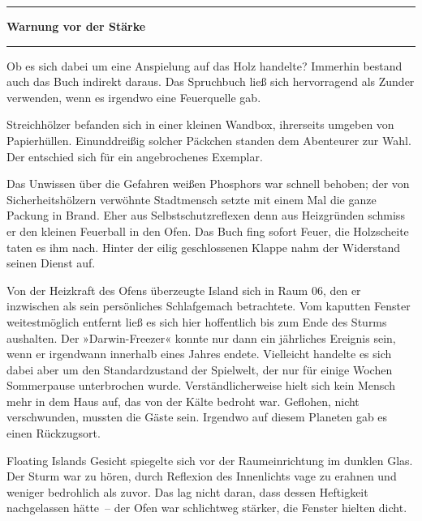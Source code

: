 \noindent \parbox{\textwidth}{ \vspace{3ex} \hrule \vspace{3ex}

\textbf{Warnung vor der Stärke}


\vspace{3ex} \hrule \vspace{3ex} }

Ob es sich dabei um eine Anspielung auf das Holz handelte? Immerhin bestand auch das Buch indirekt daraus. Das Spruchbuch ließ sich hervorragend als Zunder verwenden, wenn es irgendwo eine Feuerquelle gab.

Streichhölzer befanden sich in einer kleinen Wandbox, ihrerseits umgeben von Papierhüllen. Einunddreißig solcher Päckchen standen dem Abenteurer zur Wahl. Der entschied sich für ein angebrochenes Exemplar.

Das Unwissen über die Gefahren weißen Phosphors war schnell behoben; der von Sicherheitshölzern verwöhnte Stadtmensch setzte mit einem Mal die ganze Packung in Brand. Eher aus Selbstschutzreflexen denn aus Heizgründen schmiss er den kleinen Feuerball in den Ofen. Das Buch fing sofort Feuer, die Holzscheite taten es ihm nach. Hinter der eilig geschlossenen Klappe nahm der Widerstand seinen Dienst auf.

Von der Heizkraft des Ofens überzeugte Island sich in Raum 06, den er inzwischen als sein persönliches Schlafgemach betrachtete. Vom kaputten Fenster weitestmöglich entfernt ließ es sich hier hoffentlich bis zum Ende des Sturms aushalten. Der »Darwin-Freezer« konnte nur dann ein jährliches Ereignis sein, wenn er irgendwann innerhalb eines Jahres endete. Vielleicht handelte es sich dabei aber um den Standardzustand der Spielwelt, der nur für einige Wochen Sommerpause unterbrochen wurde. Verständlicherweise hielt sich kein Mensch mehr in dem Haus auf, das von der Kälte bedroht war. Geflohen, nicht verschwunden, mussten die Gäste sein. Irgendwo auf diesem Planeten gab es einen Rückzugsort.

Floating Islands Gesicht spiegelte sich vor der Raumeinrichtung im dunklen Glas. Der Sturm war zu hören, durch Reflexion des Innenlichts vage zu erahnen und weniger bedrohlich als zuvor. Das lag nicht daran, dass dessen Heftigkeit nachgelassen hätte~– der Ofen war schlichtweg stärker, die Fenster hielten dicht.

